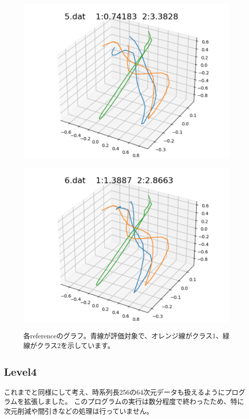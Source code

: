 \begin{figure}[h]
\begin{minipage}[b]{0.32\linewidth}
  \includegraphics[keepaspectratio, scale=0.3]
  {./pic/level3/5_dat_l3.pdf}
  \label{5dat}
 \end{minipage}
  \begin{minipage}[b]{0.32\linewidth}
  \centering
  \includegraphics[keepaspectratio, scale=0.3]
  {./pic/level3/6_dat_l3.pdf}
  \label{6dat}
 \end{minipage}
 \caption{各referenceのグラフ。青線が評価対象で、オレンジ線がクラス1、緑線がクラス2を示しています。}\label{reg_poly}
\end{figure}

\newpage

\subsection*{Level4}
これまでと同様にして考え、時系列長256の64次元データも扱えるようにプログラムを拡張しました。
このプログラムの実行は数分程度で終わったため、特に次元削減や間引きなどの処理は行っていません。

